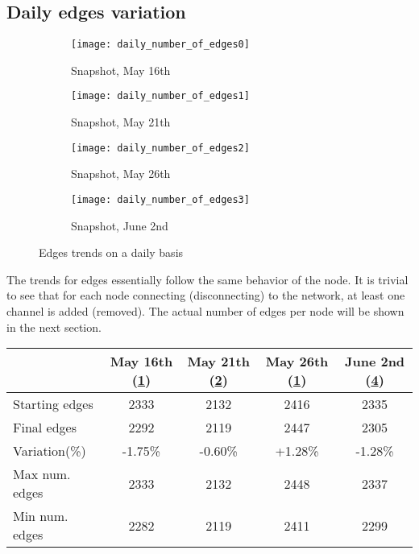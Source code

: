 	\newpage
	\subsection{Daily edges variation}

		\begin{figure}[t]
		\centering
		\begin{subfigure}{0.45\textwidth}
			\centering
			\texttt{[image: daily\_number\_of\_edges0]}
			\caption{Snapshot, May 16th}
			\label{daily_edges0}
		\end{subfigure}
		\begin{subfigure}{0.45\textwidth}
			\centering
			\texttt{[image: daily\_number\_of\_edges1]}
			\caption{Snapshot, May 21th}
			\label{daily_edges1}
		\end{subfigure}
		\begin{subfigure}{0.45\textwidth}
			\centering
			\texttt{[image: daily\_number\_of\_edges2]}
			\caption{Snapshot, May 26th}
			\label{daily_edges2}
		\end{subfigure}
		\begin{subfigure}{0.45\textwidth}
			\centering
			\texttt{[image: daily\_number\_of\_edges3]}
			\caption{Snapshot, June 2nd}
			\label{daily_edges3}
		\end{subfigure}
		
		\caption{Edges trends on a daily basis}
		\label{daily_edges_variation}
	\end{figure}

	The trends for edges essentially follow the same behavior of the node. It is trivial to see that for each node connecting (disconnecting) to the network, at least one channel is added (removed). The actual number of edges per node will be shown in the next section.
	
	\begin{center}
	\begin{tabulary}{\linewidth}{| L | C | C | C | C |}
		\hline
		& May 16th (\ref{daily_edges0}) & May 21th (\ref{daily_edges1}) & May 26th (\ref{daily_edges0}) & June 2nd (\ref{daily_edges3}) \\
		\hline
		Starting edges & 2333 & 2132 & 2416 & 2335 \\ \hline
		Final edges & 2292 & 2119 & 2447 & 2305 \\ \hline
		Variation(\%) & -1.75\% & -0.60\% & +1.28\% & -1.28\% \\ \hline
		Max num. edges & 2333 & 2132 & 2448 & 2337 \\ \hline
		Min num. edges & 2282 & 2119 & 2411 & 2299 \\ \hline	
	\end{tabulary}
	\end{center}

